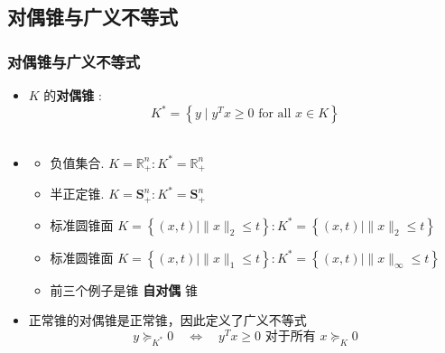 \documentclass[handout]{beamer}
\begin{document}
\subsection{对偶锥与广义不等式}
\begin{frame}
\frametitle{对偶锥与广义不等式}

\begin{itemize}[<+-> ]
\item{}
$K$ 的\textbf{对偶锥} :
\begin{equation}
	K^{*}=\left\{y \mid y^{T} x \geq 0 \text { for all } x \in K\right\}
\end{equation}\\
\item  {}
\begin{itemize}
	\item 负值集合. $ K=\mathbb{R}_{+}^{n}: K^{*}=\mathbb{R}_{+}^{n}$
    \item 半正定锥.
     $ K=\mathbf{S}_{+}^{n}: K^{*}=\mathbf{S}_{+}^{n}$
    \item 标准圆锥面 $K=\left\{(x, t) \mid\|x\|_{2} \leq t\right\}: K^{*}=\left\{(x, t) \mid\|x\|_{2} \leq t\right\}$
    \item 标准圆锥面 $K=\left\{(x, t) \mid\|x\|_{1} \leq t\right\}: K^{*}=\left\{(x, t) \mid\|x\|_{\infty} \leq t\right\}$
\item 前三个例子是锥 \textbf{自对偶} 锥
\end{itemize}

\item 正常锥的对偶锥是正常锥，因此定义了广义不等式
   \begin{equation}
	y \succeq_{K^{*}} 0 \quad \Longleftrightarrow \quad y^{T} x \geq 0 \text { 对于所有 } x \succeq_{K} 0
    \end{equation}
\end{itemize}

\end{frame}
\end{document}
